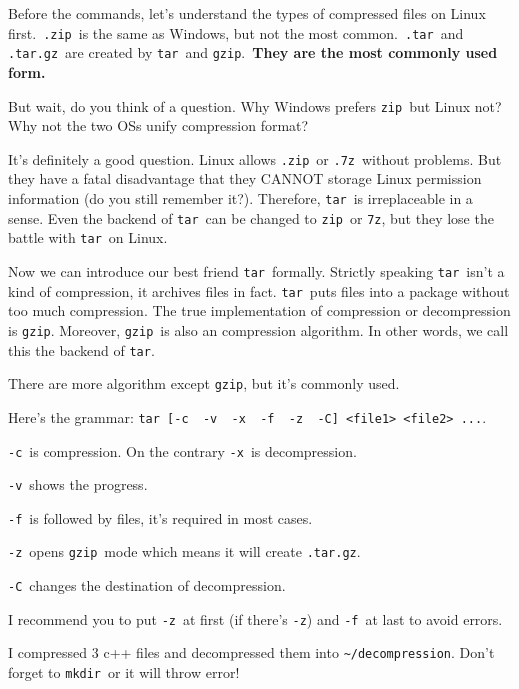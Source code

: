 \documentclass[12pt]{ctexart}
\newenvironment{mdquote}
{%
  \par\noindent
  \begin{list}{}{%
      \setlength{\leftmargin}{1em}%
      \setlength{\rightmargin}{0pt}%
      \setlength{\itemindent}{0pt}%
      \setlength{\listparindent}{\parindent}%
      \setlength{\topsep}{0.5\baselineskip}%
  }
  \item[\textbf{>}\ ]\itshape
}
{\end{list}\par}
\begin{document}
Before the commands, let's understand the types of
compressed files on Linux first.\ \texttt{.zip}\ is the same as Windows,
but not the most common.\ \texttt{.tar}\ and \texttt{.tar.gz}\ are created
by \texttt{tar}\ and \texttt{gzip}.\ \textbf{They are the most commonly
used form.}

But wait, do you think of a question. Why Windows prefers \texttt{zip}\
but Linux not? Why not the two OSs unify compression format?

It's definitely a good question. Linux allows
\texttt{.zip}\ or \texttt{.7z}\ without problems. But they have a fatal
disadvantage that they CANNOT storage Linux permission information (do
you still remember it?). Therefore, \texttt{tar}\ is irreplaceable in a
sense. Even the backend of \texttt{tar}\ can be changed to \texttt{zip}\
or \texttt{7z}, but they lose the battle with \texttt{tar}\ on Linux.

Now we can introduce our best friend \texttt{tar}\ formally. Strictly
speaking \texttt{tar}\ isn't a kind of compression, it
archives files in fact. \texttt{tar}\ puts files into a package without
too much compression. The true implementation of compression or
decompression is \texttt{gzip}. Moreover, \texttt{gzip}\ is also an
compression algorithm. In other words, we call this the backend of
\texttt{tar}.

\begin{mdquote}
There are more algorithm except \texttt{gzip}, but it's
commonly used.
\end{mdquote}

Here's the grammar:
\texttt{tar\ {[}-c\ \textbar{}\ -v\ \textbar{}\ -x\ \textbar{}\ -f\ \textbar{}\ -z\ \textbar{}\ -C{]}\ \textless{}file1\textgreater{}\ \textless{}file2\textgreater{}\ ...}.

\texttt{-c}\ is compression. On the contrary \texttt{-x}\ is
decompression.

\texttt{-v}\ shows the progress.

\texttt{-f}\ is followed by files, it's required in most
cases.

\texttt{-z}\ opens \texttt{gzip}\ mode which means it will create
\texttt{.tar.gz}.

\texttt{-C}\ changes the destination of decompression.

I recommend you to put \texttt{-z}\ at first (if there's
\texttt{-z}) and \texttt{-f}\ at last to avoid errors.

I compressed 3 c++ files and decompressed them into
\texttt{\textasciitilde{}/decompression}. Don't forget
to \texttt{mkdir}\ or it will throw error!
\end{document}
